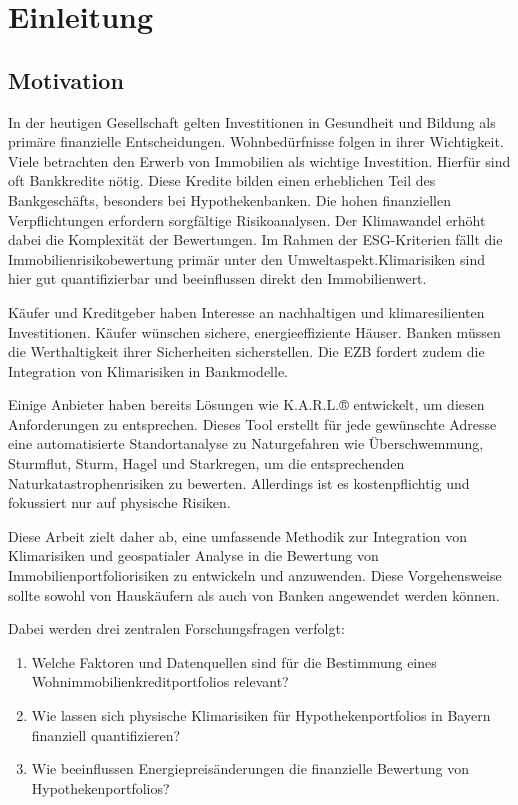 \section{Einleitung}
\subsection{Motivation}

In der heutigen Gesellschaft gelten Investitionen in Gesundheit und Bildung als primäre finanzielle Entscheidungen. Wohnbedürfnisse folgen in ihrer Wichtigkeit. Viele betrachten den Erwerb von Immobilien als wichtige Investition. Hierfür sind oft Bankkredite nötig.
Diese Kredite bilden einen erheblichen Teil des Bankgeschäfts, besonders bei Hypothekenbanken. Die hohen finanziellen Verpflichtungen erfordern sorgfältige Risikoanalysen. Der Klimawandel erhöht dabei die Komplexität der Bewertungen. Im Rahmen der ESG-Kriterien fällt die Immobilienrisikobewertung primär unter den Umweltaspekt.Klimarisiken sind hier gut quantifizierbar und beeinflussen direkt den Immobilienwert. 

Käufer und Kreditgeber haben Interesse an nachhaltigen und klimaresilienten Investitionen. Käufer wünschen sichere, energieeffiziente Häuser. Banken müssen die Werthaltigkeit ihrer Sicherheiten sicherstellen. Die EZB fordert zudem die Integration von Klimarisiken in Bankmodelle.

Einige Anbieter haben bereits Lösungen wie K.A.R.L.® entwickelt, um diesen Anforderungen zu entsprechen. Dieses Tool erstellt für jede gewünschte Adresse eine automatisierte Standortanalyse zu Naturgefahren wie Überschwemmung, Sturmflut, Sturm, Hagel und Starkregen, um die entsprechenden Naturkatastrophenrisiken zu bewerten. Allerdings ist es kostenpflichtig und fokussiert nur auf physische Risiken.

Diese Arbeit zielt daher ab, eine umfassende Methodik zur Integration von Klimarisiken und geospatialer Analyse in die Bewertung von Immobilienportfoliorisiken zu entwickeln und anzuwenden. Diese Vorgehensweise sollte sowohl von Hauskäufern als auch von Banken angewendet werden können.

Dabei werden drei zentralen Forschungsfragen verfolgt:

\begin{enumerate}
    \item Welche Faktoren und Datenquellen sind für die Bestimmung eines Wohnimmobilienkreditportfolios relevant?
    \item Wie lassen sich physische Klimarisiken für Hypothekenportfolios in Bayern finanziell quantifizieren?
    \item Wie beeinflussen Energiepreisänderungen die finanzielle Bewertung von Hypothekenportfolios?
    \end{enumerate}

